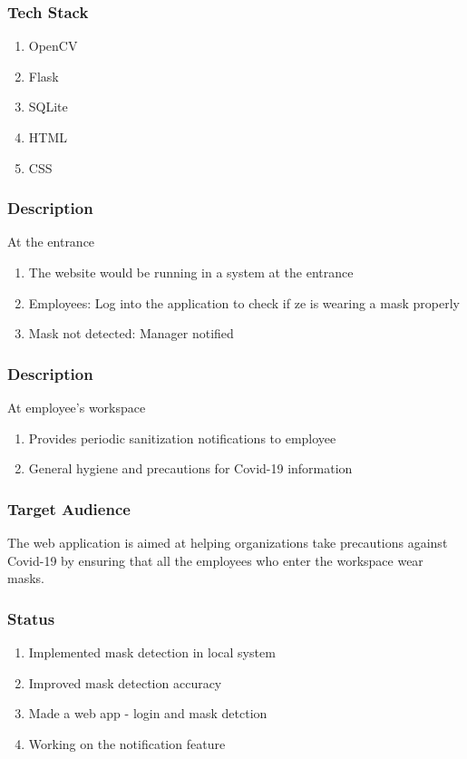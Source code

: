 \documentclass[14pt]{beamer}
\begin{document}
\begin{frame}
    \frametitle{Tech Stack}
    \begin{enumerate}
        \item OpenCV
        \item Flask
        \item SQLite
        \item HTML
        \item CSS
    \end{enumerate}
\end{frame} 

\begin{frame}
    \frametitle{Description}
    At the entrance
    \begin{enumerate}
        \item The website would be running in a system at the entrance

        \item Employees: Log into the application to check if ze is wearing a mask properly

        \item Mask not detected: Manager notified
    \end{enumerate}
\end{frame}

\begin{frame}
    \frametitle{Description}
    At employee's workspace
    \begin{enumerate}
        \item Provides periodic sanitization notifications to employee
            
        \item General hygiene and precautions for Covid-19 information
    \end{enumerate}
\end{frame}

\begin{frame}
    \frametitle{Target Audience}
    The web application is  aimed at helping organizations take precautions against Covid-19 by ensuring that all the employees who enter the workspace wear masks.
\end{frame}

\begin{frame}
    \frametitle{Status}
    \begin{enumerate}
        \item Implemented mask detection in local system
        \item Improved mask detection accuracy
        \item Made a web app - login and mask detction
        \item Working on the notification feature
    \end{enumerate}
\end{frame}
\end{document}
